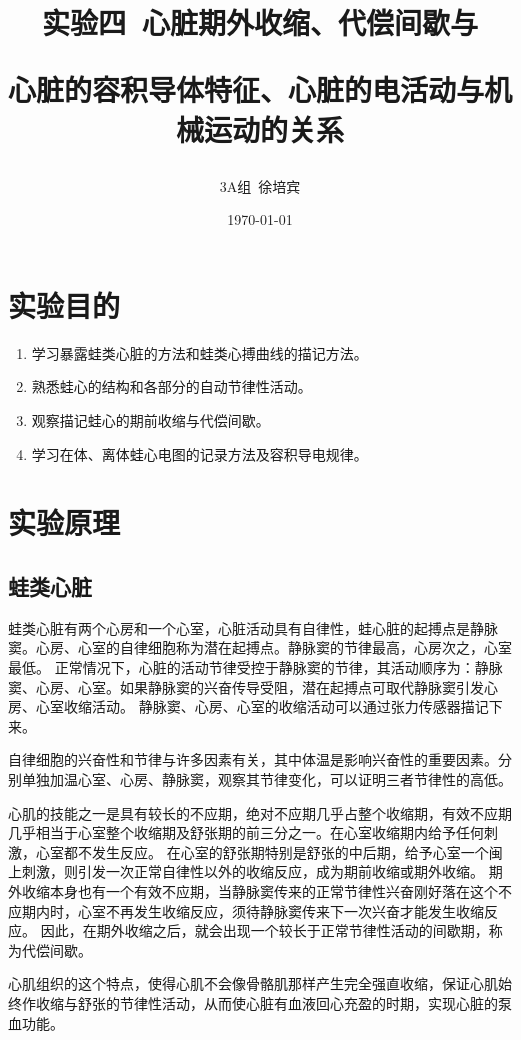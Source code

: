\documentclass[UTF8]{article}
\title{实验四\ 心脏期外收缩、代偿间歇与

心脏的容积导体特征、心脏的电活动与机械运动的关系}
\author{3A组\ 徐培宾}
\date{\today}
\begin{document}
    \maketitle
    \section{实验目的}
    \begin{enumerate}
    \item 学习暴露蛙类心脏的方法和蛙类心搏曲线的描记方法。
    \item 熟悉蛙心的结构和各部分的自动节律性活动。
    \item 观察描记蛙心的期前收缩与代偿间歇。
    \item 学习在体、离体蛙心电图的记录方法及容积导电规律。
    \end{enumerate}
    \section{实验原理}
    \subsection{蛙类心脏}
    蛙类心脏有两个心房和一个心室，心脏活动具有自律性，蛙心脏的起搏点是静脉窦。心房、心室的自律细胞称为潜在起搏点。静脉窦的节律最高，心房次之，心室最低。
    正常情况下，心脏的活动节律受控于静脉窦的节律，其活动顺序为：静脉窦、心房、心室。如果静脉窦的兴奋传导受阻，潜在起搏点可取代静脉窦引发心房、心室收缩活动。
    静脉窦、心房、心室的收缩活动可以通过张力传感器描记下来。

    自律细胞的兴奋性和节律与许多因素有关，其中体温是影响兴奋性的重要因素。分别单独加温心室、心房、静脉窦，观察其节律变化，可以证明三者节律性的高低。

    心肌的技能之一是具有较长的不应期，绝对不应期几乎占整个收缩期，有效不应期几乎相当于心室整个收缩期及舒张期的前三分之一。在心室收缩期内给予任何刺激，心室都不发生反应。
    在心室的舒张期特别是舒张的中后期，给予心室一个闽上刺激，则引发一次正常自律性以外的收缩反应，成为期前收缩或期外收缩。
    期外收缩本身也有一个有效不应期，当静脉窦传来的正常节律性兴奋刚好落在这个不应期内时，心室不再发生收缩反应，须待静脉窦传来下一次兴奋才能发生收缩反应。
    因此，在期外收缩之后，就会出现一个较长于正常节律性活动的间歇期，称为代偿间歇。

    心肌组织的这个特点，使得心肌不会像骨骼肌那样产生完全强直收缩，保证心肌始终作收缩与舒张的节律性活动，从而使心脏有血液回心充盈的时期，实现心脏的泵血功能。
\end{document}
